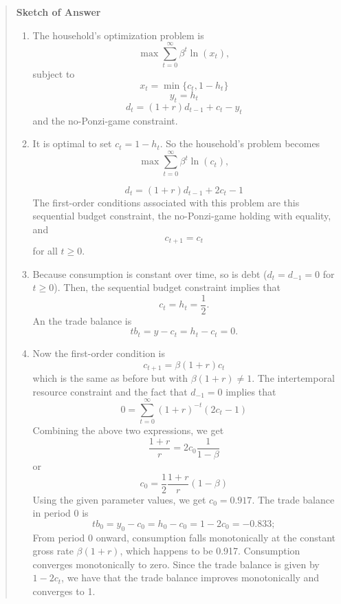 \begin{exercise}
\begin{quote}
{\bf Sketch of Answer}
\begin{enumerate}
\item  The household's optimization problem is
\[ \max \sum_{t=0}^{\infty} \beta^t \ln( x_t),\]
subject to 
\[
x_t = \min\{c_t,1-h_t\}
\]
\[
y_t = h_t
\]
\[
d_t = (1+r) d_{t-1} +c_t -y_t
\]
and the no-Ponzi-game constraint. 
\item It is optimal to set $c_t = 1-h_t$. So the household's problem becomes
\[ \max \sum_{t=0}^{\infty} \beta^t \ln( c_t),\]

\[
d_t = (1+r) d_{t-1} +2c_t -1
\]
The first-order conditions associated with this problem are this sequential budget constraint, the no-Ponzi-game holding with equality, and 
\[
c_{t+1} = c_t 
\]
for all $t\ge0$. 
\item Because consumption is constant over time, so is debt ($d_t=d_{-1}=0$ for $t\ge0$). Then, the sequential budget constraint implies that 
\[c_t = h_t =\frac12.\]
An the trade balance is
\[tb_t = y-c_t = h_t-c_t=0.\]
\item Now the first-order condition is
\[c_{t+1} = \beta(1+r) c_t\]
which is the same as before but with $\beta(1+r)\neq 1$. 
The intertemporal resource constraint and the fact that $d_{-1}=0$ implies that
\[
0 = \sum_{t=0}^{\infty} (1+r)^{-t} 
(2c_t -1)
\]
Combining the above two expressions, we get
\[
\frac{1+r}r = 2c_0 \frac1{1-\beta}
\]
or 
\[
c_0 = \frac12 \frac{1+r}r (1-\beta)
\]
Using the given parameter values, we get
$c_0 = 0.917$. 
The trade balance in period 0 is
\[tb_0= y_0-c_0=h_0-c_0=1-2c_0=-0.833;\]
From period 0 onward, consumption falls monotonically at the constant gross rate $\beta(1+r)$, which happens to be 0.917. Consumption converges monotonically to zero.  Since the trade balance is given by $1-2c_t$, we have that the trade balance improves monotonically and converges to 1. 
\end{enumerate}
\end{quote}
\end{exercise}




